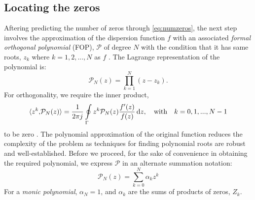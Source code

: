 \documentclass[12pt]{article}
\begin{document}
\subsection*{Locating the zeros}
%
Aftering predicting the number of zeros through \eqref{eq:numzeros}, the next step involves the approximation of the dispersion function $f$ with an associated \emph{formal orthogonal polynomial} (FOP), $\mathcal P$ of degree $N$ with the condition that it has same roots, $z_k$ where $k = 1,2,...,N$ as $f$ \cite{Delves1967c,Kravanja1999}. The Lagrange representation of the polynomial is:
%
\begin{equation}
  \mathcal{P}_N(z) = \prod \limits_{k = 1}^N \left(z - z_k \right).
  \label{eq:poly}
\end{equation}
%
For orthogonality, we require the inner product,
%
\begin{equation}
  \langle z^k{,} \mathcal{P}_N(z)\rangle = \frac{1}{2 \pi j} \oint \limits_{\Gamma} z^k \mathcal{P}_N(z) \frac{f'(z)}{f(z)} \dif z, \quad \mathrm{with}\quad k = 0,1,...,N-1
  \label{eq:fop}
\end{equation}
%
to be zero \cite{Kravanja2000c}. The polynomial approximation of the original function reduces the complexity of the problem as techniques for finding polynomial roots are robust and well-established. Before we proceed, for the sake of convenience in obtaining the required polynomial, we express $\mathcal{P}$ in an alternate summation notation:
%
\begin{equation}
  \mathcal{P}_N(z) = \sum \limits_{k = 0}^N \alpha_k z^k
  \label{eq:poly_sum}
\end{equation}
%
For a \emph{monic polynomial}, $\alpha_N = 1$, and $\alpha_k$ are the sums of products of zeros, $Z_k$.
\end{document}
